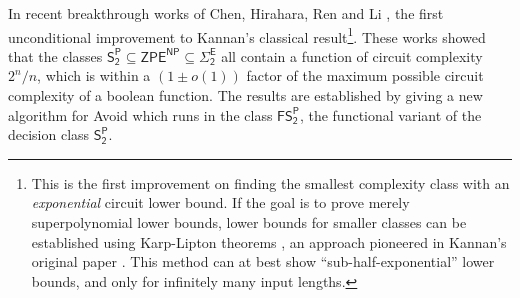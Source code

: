 
In recent breakthrough works of Chen, Hirahara, Ren and Li \cite{CHR,Li}, the first unconditional improvement to Kannan's classical result\footnote{This is the first improvement on finding the smallest complexity class with an \emph{exponential} circuit lower bound. If the goal is to prove merely superpolynomial lower bounds, lower bounds for smaller classes can be established using Karp-Lipton theorems \cite{karp-lipton}, an approach pioneered in Kannan's original paper \cite{Kannan}. This method can at best show ``sub-half-exponential'' lower bounds, and only for infinitely many input lengths.}. These works showed that the classes $\mathsf{S_2^P}\subseteq \mathsf{ZPE^{NP}} \subseteq\mathsf{\Sigma_2^E} $ all contain a function of circuit complexity $2^n/n$, which is within a $(1 \pm o(1))$ factor of the maximum possible circuit complexity of a boolean function. The results are established by giving a new algorithm for Avoid which runs in the class $\mathsf{FS_2^P}$, the functional variant of the decision class $\mathsf{S_2^P}$. 

